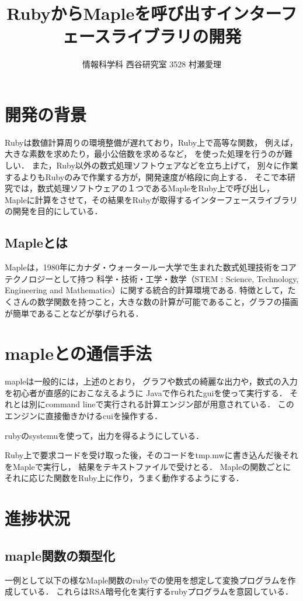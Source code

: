 \documentclass[10pt,a4j,twocolumn]{jsarticle}
\begin{document}
\title{RubyからMapleを呼び出すインターフェースライブラリの開発}
\author{情報科学科 西谷研究室 3528 村瀬愛理}
\date{}
\maketitle
\section{開発の背景}
Rubyは数値計算周りの環境整備が遅れており，Ruby上で高等な関数，
例えば，大きな素数を求めたり，最小公倍数を求めるなど，
を使った処理を行うのが難しい．
また，Ruby以外の数式処理ソフトウェアなどを立ち上げて，
別々に作業するよりもRubyのみで作業する方が，開発速度が格段に向上する．
そこで本研究では，数式処理ソフトウェアの１つであるMapleをRuby上で呼び出し，
Mapleに計算をさせて，その結果をRubyが取得するインターフェースライブラリの開発を目的にしている．

\subsection{Mapleとは}
Mapleは，1980年にカナダ・ウォータールー大学で生まれた数式処理技術をコアテクノロジーとして持つ
科学・技術・工学・数学（STEM : Science, Technology, Engineering and Mathematics）に関する統合的計算環境である\cite{Maple}.
特徴として，たくさんの数学関数を持つこと，大きな数の計算が可能であること，グラフの描画が簡単であることなどが挙げられる．

\section{mapleとの通信手法}
mapleは一般的には，上述のとおり，
グラフや数式の綺麗な出力や，数式の入力を初心者が直感的におこなえるように
Javaで作られたguiを使って実行する．
それとは別にcommand lineで実行される計算エンジン部が用意されている．
このエンジンに直接働きかけるcuiを操作する．

rubyのsystemuを使って，出力を得るようにしている．

Ruby上で要求コードを受け取った後，そのコードをtmp.mwに書き込んだ後それをMapleで実行し，
結果をテキストファイルで受けとる．
Mapleの関数ごとにそれに応じた関数をRuby上に作り，うまく動作するようにする．

\section{進捗状況}
\subsection{maple関数の類型化}
一例として以下の様なMaple関数のrubyでの使用を想定して変換プログラムを作成している．
これらはRSA暗号化を実行するrubyプログラムを意図している．
\end{document}
